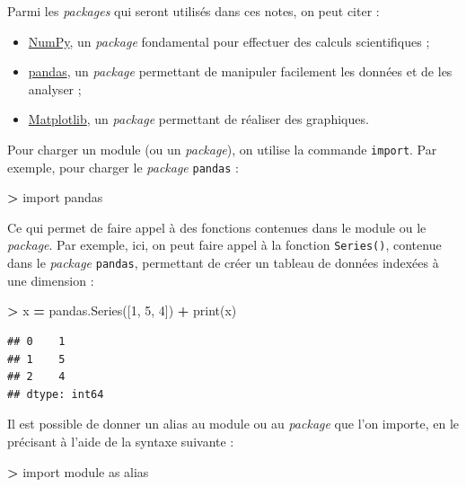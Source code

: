 \documentclass[12pt,]{book}
\newenvironment{Shaded}{\begin{snugshade}}{\end{snugshade}}
\newcommand{\DecValTok}[1]{\textcolor[rgb]{0.00,0.00,0.81}{#1}}
\newcommand{\ImportTok}[1]{#1}
\newcommand{\OperatorTok}[1]{\textcolor[rgb]{0.81,0.36,0.00}{\textbf{#1}}}
\newcommand{\BuiltInTok}[1]{#1}
\newcommand{\NormalTok}[1]{#1}
\providecommand{\tightlist}{%
  \setlength{\itemsep}{0pt}\setlength{\parskip}{0pt}}
\numberwithin{equation}{section}
\numberwithin{countremarque}{section}
\begin{document}
Parmi les \emph{packages} qui seront utilisés dans ces notes, on peut
citer :

\begin{itemize}
\tightlist
\item
  \href{http://www.numpy.org/}{NumPy}, un \emph{package} fondamental
  pour effectuer des calculs scientifiques ;
\item
  \href{https://pandas.pydata.org/}{pandas}, un \emph{package}
  permettant de manipuler facilement les données et de les analyser ;
\item
  \href{https://matplotlib.org/}{Matplotlib}, un \emph{package}
  permettant de réaliser des graphiques.
\end{itemize}

Pour charger un module (ou un \emph{package}), on utilise la commande
\texttt{import}. Par exemple, pour charger le \emph{package}
\texttt{pandas} :

\begin{Shaded}
\begin{Highlighting}[]
\OperatorTok{>} \ImportTok{import}\NormalTok{ pandas}
\end{Highlighting}
\end{Shaded}

Ce qui permet de faire appel à des fonctions contenues dans le module ou
le \emph{package}. Par exemple, ici, on peut faire appel à la fonction
\texttt{Series()}, contenue dans le \emph{package} \texttt{pandas},
permettant de créer un tableau de données indexées à une dimension :

\begin{Shaded}
\begin{Highlighting}[]
\OperatorTok{>}\NormalTok{ x }\OperatorTok{=}\NormalTok{ pandas.Series([}\DecValTok{1}\NormalTok{, }\DecValTok{5}\NormalTok{, }\DecValTok{4}\NormalTok{])}
\OperatorTok{+} \BuiltInTok{print}\NormalTok{(x)}
\end{Highlighting}
\end{Shaded}

\begin{lstlisting}
## 0    1
## 1    5
## 2    4
## dtype: int64
\end{lstlisting}

Il est possible de donner un alias au module ou au \emph{package} que
l'on importe, en le précisant à l'aide de la syntaxe suivante :

\begin{Shaded}
\begin{Highlighting}[]
\OperatorTok{>} \ImportTok{import}\NormalTok{ module }\ImportTok{as}\NormalTok{ alias}
\end{Highlighting}
\end{Shaded}
\end{document}
